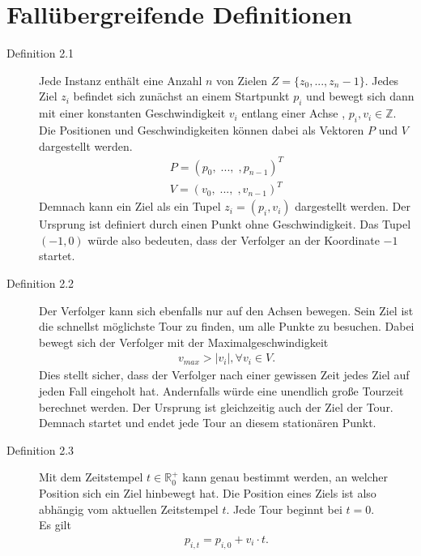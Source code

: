 \documentclass[german,version-2019-11]{uzl-thesis}
\begin{document}
\section{Fallübergreifende Definitionen}
\begin{description}
\item[Definition 2.1] 
Jede Instanz enthält eine Anzahl $n$ von Zielen $Z = \{z_0,...,z_n-1\}$. Jedes Ziel $z_i$ befindet sich zunächst an einem Startpunkt $p_i$ und bewegt sich dann mit einer konstanten Geschwindigkeit $v_i$ entlang einer Achse , $p_i, v_i \in\mathbb{Z}$. Die Positionen und Geschwindigkeiten können dabei als Vektoren $P$ und $V$ dargestellt werden.
\begin{align*}
P = (p_0, \; ..., \; ,p_{n-1})^T \\
V = (v_0, \; ..., \; ,v_{n-1})^T
\end{align*}
Demnach kann ein Ziel als ein Tupel $z_i = (p_i, v_i)$ dargestellt werden. Der Ursprung ist definiert durch einen Punkt ohne Geschwindigkeit. Das Tupel $(-1,0)$ würde also bedeuten, dass der Verfolger an der Koordinate $-1$ startet.
\end{description}

\begin{description}
\item[Definition 2.2] 
Der Verfolger kann sich ebenfalls nur auf den Achsen bewegen. Sein Ziel ist die schnellst möglichste Tour zu finden, um alle Punkte zu besuchen. Dabei bewegt sich der Verfolger mit der Maximalgeschwindigkeit 
\begin{align*}
v_{max} > |v_i|, \forall v_i\in V.
\end{align*}
Dies stellt sicher, dass der Verfolger nach einer gewissen Zeit jedes Ziel auf jeden Fall eingeholt hat. Andernfalls würde eine unendlich große Tourzeit berechnet werden. Der Ursprung ist gleichzeitig auch der Ziel der Tour. Demnach startet und endet jede Tour an diesem stationären Punkt.
\end{description}

\begin{description}
\item[Definition 2.3]
Mit dem Zeitstempel $t\in \mathbb{R}^+_0$ kann genau bestimmt werden, an welcher Position sich ein Ziel hinbewegt hat. Die Position eines Ziels ist also abhängig vom aktuellen Zeitstempel $t$. Jede Tour beginnt bei $t=0$. \\
Es gilt
\begin{align*}
p_{i,t} = p_{i,0} + v_i\cdot t.
\end{align*} 
\end{description}
\end{document}
